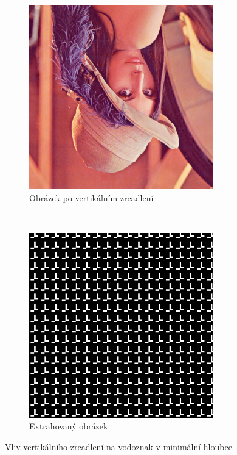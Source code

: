\begin{figure}[h!]
    \begin{center}
        \begin{subfigure}[t]{0.5\textwidth}
            \centering
            \includegraphics[height=8cm]{images/flip_vertical.jpg}
            \caption{Obrázek po vertikálním zrcadlení}
        \end{subfigure}%
        ~
        \begin{subfigure}[t]{0.5\textwidth}
            \centering
            \includegraphics[height=8cm]{images/flip_vertical_extracted.jpg}
            \caption{Extrahovaný obrázek}
        \end{subfigure}
        \caption{Vliv vertikálního zrcadlení na vodoznak v minimální hloubce}
    \end{center}
\end{figure}